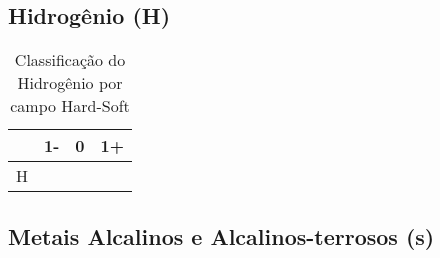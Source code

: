 \documentclass{article}
\renewcommand\arraystretch{1.25}	%
\begin{document}
\newcommand\HSABemphH{%
	\cellcolor{DRed}{\textcolor{Red}{H}}%
}
\newcommand\HSABemphI{%
	\cellcolor{DOrange}{\textcolor{Orange}{I}}%
}
\newcommand\HSABemphS{%
	\cellcolor{DYellow}{\textcolor{Yellow}{S}}%
}
\newcommand\HSABemphIH{%
	\cellcolor{DOrange!50!DRed}%
	{\textcolor{Orange!50!Red}{I}}%
}
\newcommand\HSABemphIS{%
	\cellcolor{DOrange!50!DYellow}%
	{\textcolor{Orange!50!Yellow}{I}}%
}


\subsection{Hidrogênio (H)}

{


\begin{table}[H]\centering
\begin{tabular}{*{4}{c}}
	
	& 1- & 0 & 1+
	
	\\ \toprule
	
	H & \HSABemphS & \HSABemphI & \HSABemphH
	
	\\ \bottomrule

\end{tabular}
\caption{Classificação do Hidrogênio por campo Hard-Soft}
\end{table}
}


\subsection{Metais Alcalinos e Alcalinos-terrosos (s)}
\end{document}

